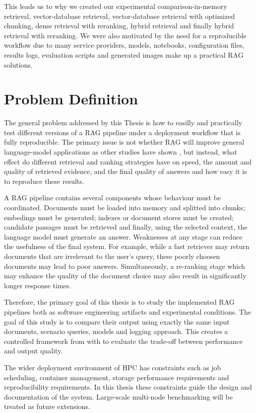 This leads us to why we created our experimental comparison-in-memory retrieval, vector-database retrieval, vector-database retrieval with optimized chunking, dense retrieval with reranking, hybrid retrieval and finally hybrid retrieval with reranking. We were also motivated by the need for a reproducible workflow due to many service providers, models, notebooks, configuration files, results logs, evaluation scripts and generated images make up a practical \ac{RAG} solutions.

\section{Problem Definition}

The general problem addressed by this Thesis is how to easilly and practically test different versions of a \ac{RAG} pipeline under a deployment workflow that is fully reproducible. The primary issue is not whether \ac{RAG} will improve general language-model applications as other studies have shown \cite{lewis2020rag,izacard2021leveraging}, but instead, what effect do different retrieval and ranking strategies have on speed, the amount and quality of retrieved evidence, and the final quality of answers and how easy it is to reproduce these results.

A \ac{RAG} pipeline contains several components whose behaviour must be coordinated. Documents must be loaded into memory and splitted into chunks; embedings must be generated; indexes or document stores must be created; candidate passages must be retrieved and finally, using the selected context, the language model must generate an answer. Weaknesses at any stage can reduce the usefulness of the final system. For example, while a fast retriever may return documents that are irrelevant to the user's query, these poorly choosen documents may lead to poor answers. Simultaneously, a re-ranking stage which may enhance the quality of the document choice may also result in significantly longer response times.

Therefore, the primary goal of this thesis is to study the implemented \ac{RAG} pipelines both as software engineering artifacts and experimental conditions. The goal of this study is to compare their output using exactly the same input documents, scenario queries, models and logging approach. This creates a controlled framework from with to evaluate the trade-off between performance and output quality.

The wider deployment environment of HPC has constraints such as job scheduling, container management, storage performance requirements and reproducibility requirements. In this thesis these constraints guide the design and documentation of the system. Large-scale multi-node benchmarking will be treated as future extensions.

